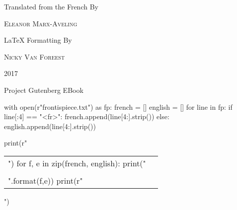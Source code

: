 \documentclass[a5paper]{book}
\begin{document}
\begin{titlepage}
	\vspace{1\baselineskip} %

	Translated from the French By \\
	
	\vspace{0.5\baselineskip} %
	
	{\scshape\large Eleanor Marx-Aveling \\} %

	\vspace{1\baselineskip} %

	\LaTeX\/ Formatting By \\
	
	\vspace{0.5\baselineskip} %
	
	{\scshape\large Nicky Van Foreest \\} %

	
	
	\vfill %
	
	
	
	\vspace{0.3\baselineskip} %
	
	2017 %
	
	{\large Project Gutenberg EBook} %
\end{titlepage}
      
\frontmatter
\tableofcontents


\clearpage

\begin{pycode}
with open(r"frontispiece.txt") as fp:
    french = []
    english = []
    for line in fp:
        if line[:4] == "<fr>":
            french.append(line[4:].strip())
        else:
            english.append(line[4:].strip())

print(r"\begin{longtable}{PP}")
for f, e in zip(french, english):
    print("{} & {} \\\\".format(f,e))
print(r"\end{longtable}")
\end{pycode}
\end{document}
